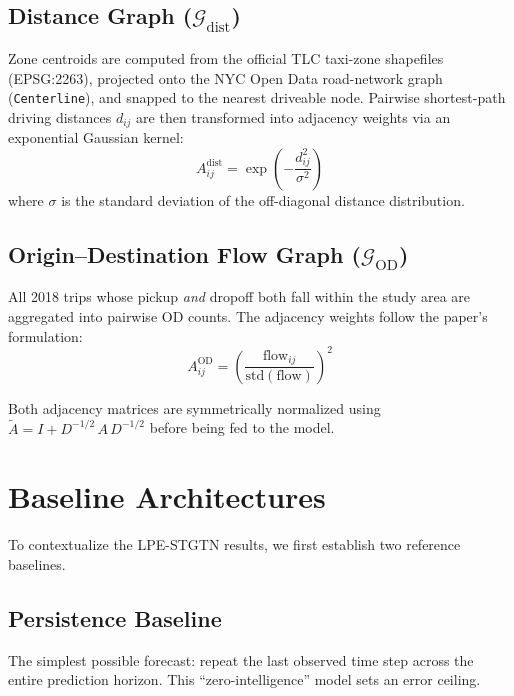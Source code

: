 \documentclass{rapportECL}
\begin{document}
\subsection{Distance Graph ($\mathcal{G}_{\text{dist}}$)}
Zone centroids are computed from the official TLC taxi-zone shapefiles (EPSG:2263), projected onto the NYC Open Data road-network graph (\texttt{Centerline}), and snapped to the nearest driveable node. Pairwise shortest-path driving distances $d_{ij}$ are then transformed into adjacency weights via an exponential Gaussian kernel:
\begin{equation}
A_{ij}^{\text{dist}} = \exp\!\left(-\frac{d_{ij}^{2}}{\sigma^{2}}\right)
\label{eq:dist_kernel}
\end{equation}
where $\sigma$ is the standard deviation of the off-diagonal distance distribution.

\subsection{Origin--Destination Flow Graph ($\mathcal{G}_{\text{OD}}$)}
All 2018 trips whose pickup \emph{and} dropoff both fall within the study area are aggregated into pairwise OD counts. The adjacency weights follow the paper's formulation:
\begin{equation}
A_{ij}^{\text{OD}} = \left(\frac{\text{flow}_{ij}}{\text{std}(\text{flow})}\right)^{2}
\end{equation}

Both adjacency matrices are symmetrically normalized using $\tilde{A} = I + D^{-1/2}\,A\,D^{-1/2}$ before being fed to the model.

\section{Baseline Architectures}

To contextualize the LPE-STGTN results, we first establish two reference baselines.

\subsection{Persistence Baseline}
The simplest possible forecast: repeat the last observed time step across the entire prediction horizon. This ``zero-intelligence'' model sets an error ceiling.
\end{document}
